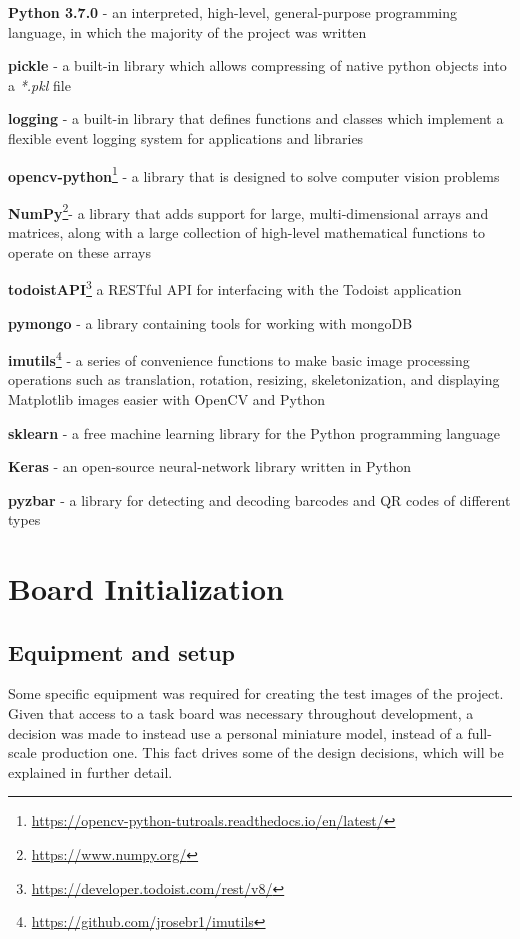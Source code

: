 \documentclass[12pt]{report}
\theoremstyle{definition}
\theoremstyle{remark}
\begin{document}
\begin{itemize}
    \item{\textbf{Python 3.7.0} - an interpreted, high-level, general-purpose programming language, in which the majority of the project was written}
    \item{\textbf{pickle} - a built-in library which allows compressing of native python objects into a \textit{*.pkl} file}
    \item{\textbf{logging} - a built-in library that defines functions and classes which implement a flexible event logging system for applications and libraries}
    \item{\textbf{opencv-python}\footnote{\url{https://opencv-python-tutroals.readthedocs.io/en/latest/}} - a library that is designed to solve computer vision problems}
    \item{\textbf{NumPy}\footnote{\url{https://www.numpy.org/}}- a library that adds support for large, multi-dimensional arrays and matrices, along with a large collection of high-level mathematical functions to operate on these arrays}
    \item{\textbf{todoistAPI}\footnote{\url{https://developer.todoist.com/rest/v8/}} a RESTful API for interfacing with the Todoist application}
    \item{\textbf{pymongo} - a library containing tools for working with mongoDB
    \item \textbf{imutils}\footnote{\url{https://github.com/jrosebr1/imutils}} - a series of convenience functions to make basic image processing operations such as translation, rotation, resizing, skeletonization, and displaying Matplotlib images easier with OpenCV and Python}
    \item{\textbf{sklearn} - a free machine learning library for the Python programming language}
    \item{\textbf{Keras} - an open-source neural-network library written in Python}
    \item{\textbf{pyzbar} - a library for detecting and decoding barcodes and QR codes of different types}
\end{itemize}


\newpage
\chapter{Board Initialization}
\section{Equipment and setup}
Some specific equipment was required for creating the test images of the project. Given that access to a task board was necessary throughout development, a decision was made to instead use a personal miniature model, instead of a full-scale production one. This fact drives some of the design decisions, which will be explained in further detail.
\end{document}
